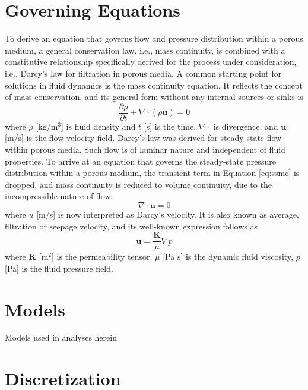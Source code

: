 \documentclass[%
 aip,
 jmp,%
 amsmath,amssymb,
 reprint,%
]{revtex4-1}
\begin{document}
\section{\label{sec:governing_equations}Governing Equations}
To derive an equation that governs flow and pressure distribution within a porous medium, a general conservation law, i.e., mass continuity, is combined with a constitutive relationship specifically derived for the process under consideration, i.e., Darcy's law for filtration in porous media. A common starting point for solutions in fluid dynamics is the mass continuity equation. It reflects the concept of mass conservation, and its general form without any internal sources or sinks is
%
\begin{equation}
\frac{\partial \rho}{\partial t}+\nabla \cdot  (\rho \mathbf{u}) = 0
\label{eq:mc}
\end{equation}
%
where $\rho$ [kg/m$^3$] is fluid density and $t$ [s] is the time, $\nabla \cdot$ is divergence, and $\mathbf{u}$ [m/s] is the flow velocity field. Darcy's law was derived for steady-state flow within porous media. Such flow is of laminar nature and independent of fluid properties. To arrive at an equation that governs the steady-state pressure distribution within a porous medium, the transient term in Equation \ref{eq:ssmc} is dropped, and mass continuity is reduced to volume continuity, due to the incompressible nature of flow:
%
\begin{equation}
\nabla \cdot  \mathbf{u} = 0
\label{eq:ssmc}
\end{equation}
%
where $u$ [m/s] is now interpreted as Darcy's velocity. It is also known as  average, filtration or seepage velocity, and its well-known expression follows as
%
\begin{equation}
\mathbf{u} = \frac{\mathbf{K}}{\mu} \nabla p
\label{eq:darcy}
\end{equation}
%
where $\mathbf{K}$ [m$^2$] is the permeability tensor, $\mu$ [Pa s] is the dynamic fluid viscosity, $p$ [Pa] is the fluid pressure field.

\section{\label{sec:models}Models}
Models used in analyses herein 

\section{\label{sec:discretization}Discretization}
\end{document}
